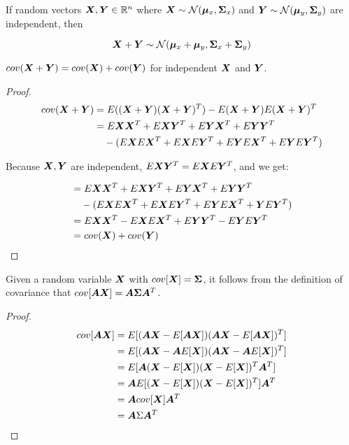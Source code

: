 \begin{thm}
    If random vectors ${\bm{X}}, {\bm{Y}} \in {\mathbb{R}}^n$ where ${\bm{X}} \sim {\mathcal{N}}({\bm{\mu}}_x, {\bm{\Sigma}}_x)$ and ${\bm{Y}} \sim {\mathcal{N}}({\bm{\mu}}_y, {\bm{\Sigma}}_y)$ are independent, then
    
    \begin{equation}
        {\bm{X}} + {\bm{Y}} \sim {\mathcal{N}}({\bm{\mu}}_x + {\bm{\mu}}_y, {\bm{\Sigma}}_x + {\bm{\Sigma}}_y)
    \end{equation}
\end{thm}

\begin{thm}
    $cov({\bm{X}} + {\bm{Y}}) = cov({\bm{X}}) + cov({\bm{Y}})$ for independent ${\bm{X}}$ and ${\bm{Y}}$.

    \begin{proof}
    \begin{align}
        cov({\bm{X}} + {\bm{Y}}) &= E(({\bm{X}} + {\bm{Y}}) ({\bm{X}} + {\bm{Y}})^T) - E({\bm{X}} + {\bm{Y}})E({\bm{X}} + {\bm{Y}})^T \\
        &= E{\bm{X}}{\bm{X}}^T + E{\bm{X}}{\bm{Y}}^T + E{\bm{Y}}{\bm{X}}^T + E{\bm{Y}}{\bm{Y}}^T \\
          &\quad - (E{\bm{X}} E{\bm{X}}^T + E{\bm{X}} E{\bm{Y}}^T + E{\bm{Y}} E{\bm{X}}^T + E {\bm{Y}} E{\bm{Y}}^T)
    \end{align}
    
    Because ${\bm{X}}, {\bm{Y}}$ are independent, $E {\bm{X}} {\bm{Y}}^T = E {\bm{X}} E {\bm{Y}}^T$, and we get:
    
    \begin{align}
        &= E{\bm{X}}{\bm{X}}^T + E{\bm{X}} {\bm{Y}}^T + E{\bm{Y}}{\bm{X}}^T + E{\bm{Y}}{\bm{Y}}^T \\
          &\quad - (E{\bm{X}} E{\bm{X}}^T + E{\bm{X}} E{\bm{Y}}^T + E{\bm{Y}} E{\bm{X}}^T + {\bm{Y}} E{\bm{Y}}^T) \\
        &= E{\bm{X}}{\bm{X}}^T - E{\bm{X}} E{\bm{X}}^T + E{\bm{Y}} {\bm{Y}}^T - E{\bm{Y}} E{\bm{Y}}^T \\
        &= cov({\bm{X}}) + cov({\bm{Y}})
    \end{align}
    \end{proof}
\end{thm}
    
\begin{thm}
    Given a random variable ${\bm{X}}$ with $cov[{\bm{X}}] = {\bm{\Sigma}}$, it follows from the definition of covariance that $cov[{\bm{A}} {\bm{X}}] = {\bm{A}} {\bm{\Sigma}} {\bm{A}}^T$.
    
    \begin{proof}
    \begin{align}
    \label{eq:gaussian-ax}
    cov[{\bm{A}} {\bm{X}}] &= E[({\bm{A}} {\bm{X}} - E[{\bm{A}} {\bm{X}}])({\bm{A}} {\bm{X}} - E[{\bm{A}} {\bm{X}}])^T] \\
    &= E[({\bm{A}} {\bm{X}} - {\bm{A}} E[{\bm{X}}])({\bm{A}} {\bm{X}} - {\bm{A}} E[{\bm{X}}])^T] \\
    &= E[{\bm{A}} ({\bm{X}} - E[{\bm{X}}])({\bm{X}} - E[{\bm{X}}])^T {\bm{A}}^T] \\
    &= {\bm{A}} E[({\bm{X}} - E[{\bm{X}}])({\bm{X}} - E[{\bm{X}}])^T] {\bm{A}}^T \\
    &= {\bm{A}} cov[{\bm{X}}] {\bm{A}}^T \\
    &= {\bm{A}} \Sigma {\bm{A}}^T
    \end{align}
    \end{proof}
\end{thm}

